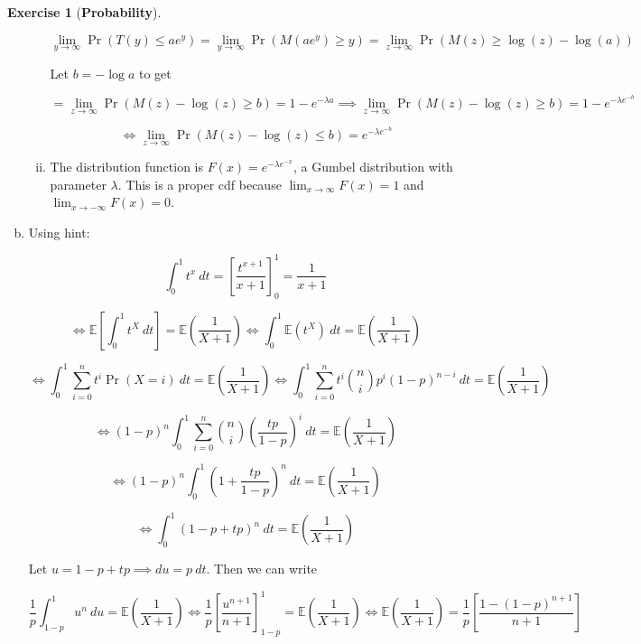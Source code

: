 \documentclass{article}
\theoremstyle{definition}
\newtheorem{exercise}{Exercise}
\theoremstyle{definition}
\theoremstyle{definition}
\theoremstyle{definition}
\theoremstyle{definition}
\newcommand{\E}{\mathbb{E}}
\begin{document}
\begin{exercise}[\textbf{Probability}]
\begin{enumerate}[(a)]
\begin{enumerate}[(i)]
\[
\lim_{y \to \infty} \Pr(T(y) \leq a e^y)  = \lim_{y \to \infty} \Pr( M(ae^y) \geq y)  = \lim_{z \to \infty} \Pr( M(z) \geq \log(z) - \log(a)) 
\]

Let \(b = -\log a\) to get 

\[
= \lim_{z \to \infty} \Pr( M(z) - \log(z) \geq   b) = 1 - e^{-\lambda a} \implies  \lim_{z \to \infty} \Pr( M(z) - \log(z) \geq  b)  = 1 - e^{-\lambda e^{-b}}
\]

\[
 \iff \lim_{z \to \infty} \Pr( M(z) - \log(z) \leq  b)  = e^{-\lambda e^{-b}}
\]



\item The distribution function is \(F(x) = e^{-\lambda e^{-x}}\), a Gumbel distribution with parameter \(\lambda\). This is a proper cdf because \(\lim_{x \to \infty} F(x) = 1\) and \(\lim_{x \to -\infty} F(x) = 0\).

\end{enumerate}

\item 


Using hint:

\[
\int_0^1 t^x  \ dt = \left[ \frac{t^{x+1}}{x+1} \right]_0^1 =  \frac{1}{x+1}
\]

\[
 \iff \E \left[ \int_0^1 t^X  \ dt \right] = \E \left( \frac{1}{X+1} \right)  \iff \int_0^1 \E ( t^X)  \ dt = \E \left( \frac{1}{X+1} \right)
\]

\[
\iff \int_0^1 \sum_{i=0}^n t^i \Pr(X = i) \ dt = \E \left( \frac{1}{X+1} \right) \iff \int_0^1 \sum_{i=0}^n t^i \binom{n}{i} p^i (1-p)^{n-i} \ dt = \E \left( \frac{1}{X+1} \right)
\]

\[
 \iff (1-p)^n \int_0^1 \sum_{i=0}^n \binom{n}{i} \left( \frac{tp}{1-p} \right) ^i  \ dt = \E \left( \frac{1}{X+1} \right)
\]

\[
 \iff (1-p)^n \int_0^1 \left( 1 + \frac{tp}{1-p} \right)^n  \ dt = \E \left( \frac{1}{X+1} \right)
\]

\[
 \iff  \int_0^1 \left( 1 - p + tp  \right)^n  \ dt = \E \left( \frac{1}{X+1} \right)
\]

Let \(u = 1 - p + tp \implies du = p \ dt\). Then we can write

\[
\frac{1}{p} \int_{1-p}^1 u^n  \ du = \E \left( \frac{1}{X+1} \right) \iff \frac{1}{p} \left[ \frac{u^{n+1}}{n+1} \right]_{1-p}^1= \E \left( \frac{1}{X+1} \right)  \iff \E \left( \frac{1}{X+1} \right) = \frac{1}{p} \left[ \frac{1 - (1-p)^{n+1}}{n+1} \right]
\]


\end{enumerate}
\end{exercise}
\end{document}
